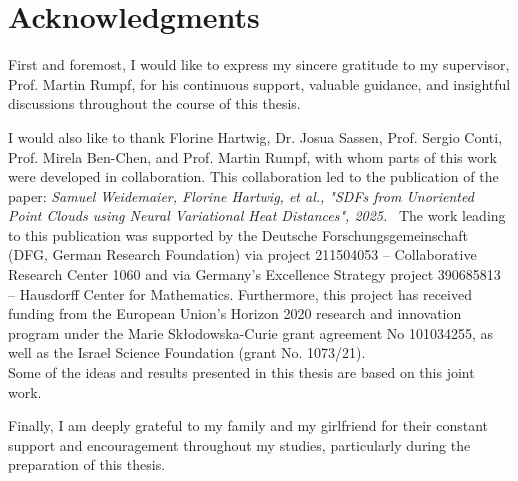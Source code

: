\documentclass[draft,12pt,openany]{book}
\theoremstyle{plainnormal}
\theoremstyle{remark}
\begin{document}
\section*{Acknowledgments}
\endgroup
First and foremost, I would like to express my sincere gratitude to my supervisor, Prof. Martin Rumpf, for his continuous support, valuable guidance, and insightful discussions throughout the course of this thesis.
\par
I would also like to thank Florine Hartwig, Dr. Josua Sassen, Prof. Sergio Conti, Prof. Mirela Ben-Chen, and Prof. Martin Rumpf, with whom parts of this work were developed in collaboration. This collaboration led to the publication of the paper:
\vspace{0.5em}
\noindent
\textit{Samuel Weidemaier, Florine Hartwig, et al., "SDFs from Unoriented Point Clouds using Neural Variational
Heat Distances", 2025.}
\,
\vspace{0.5em}
The work leading to this publication was supported by the Deutsche Forschungsgemeinschaft (DFG, German Research Foundation) via project 211504053 -- Collaborative Research Center 1060 and via Germany’s Excellence Strategy project 390685813 -- Hausdorff Center for Mathematics.
Furthermore, this project has received funding from the European Union’s Horizon 2020 research and innovation program under the Marie Skłodowska-Curie grant agreement No 101034255, as well as the Israel Science Foundation (grant No. 1073/21).\\
Some of the ideas and results presented in this thesis are based on this joint work.\par 
\noindent
Finally, I am deeply grateful to my family and my girlfriend for their constant support and encouragement throughout my studies, particularly during the preparation of this thesis.
\clearpage

\tableofcontents
\end{document}
